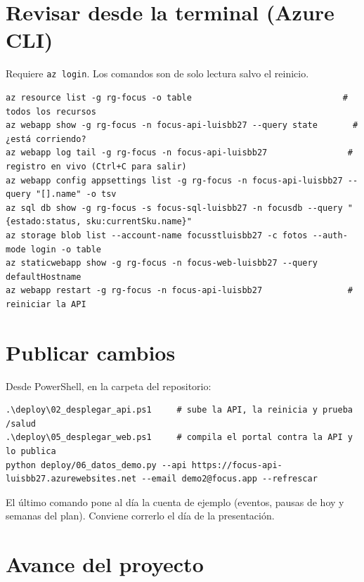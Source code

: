 \documentclass[11pt,a4paper]{article}
\begin{document}
\section{Revisar desde la terminal (Azure CLI)}
Requiere \texttt{az login}. Los comandos son de solo lectura salvo el reinicio.
\begin{lstlisting}[language=texto]
az resource list -g rg-focus -o table                              # todos los recursos
az webapp show -g rg-focus -n focus-api-luisbb27 --query state       # ¿está corriendo?
az webapp log tail -g rg-focus -n focus-api-luisbb27                # registro en vivo (Ctrl+C para salir)
az webapp config appsettings list -g rg-focus -n focus-api-luisbb27 --query "[].name" -o tsv
az sql db show -g rg-focus -s focus-sql-luisbb27 -n focusdb --query "{estado:status, sku:currentSku.name}"
az storage blob list --account-name focusstluisbb27 -c fotos --auth-mode login -o table
az staticwebapp show -g rg-focus -n focus-web-luisbb27 --query defaultHostname
az webapp restart -g rg-focus -n focus-api-luisbb27                 # reiniciar la API
\end{lstlisting}

\section{Publicar cambios}
Desde PowerShell, en la carpeta del repositorio:
\begin{lstlisting}[language=texto]
.\deploy\02_desplegar_api.ps1     # sube la API, la reinicia y prueba /salud
.\deploy\05_desplegar_web.ps1     # compila el portal contra la API y lo publica
python deploy/06_datos_demo.py --api https://focus-api-luisbb27.azurewebsites.net --email demo2@focus.app --refrescar
\end{lstlisting}
El último comando pone al día la cuenta de ejemplo (eventos, pausas de hoy y semanas del plan).
Conviene correrlo el día de la presentación.

\section{Avance del proyecto}
\end{document}
